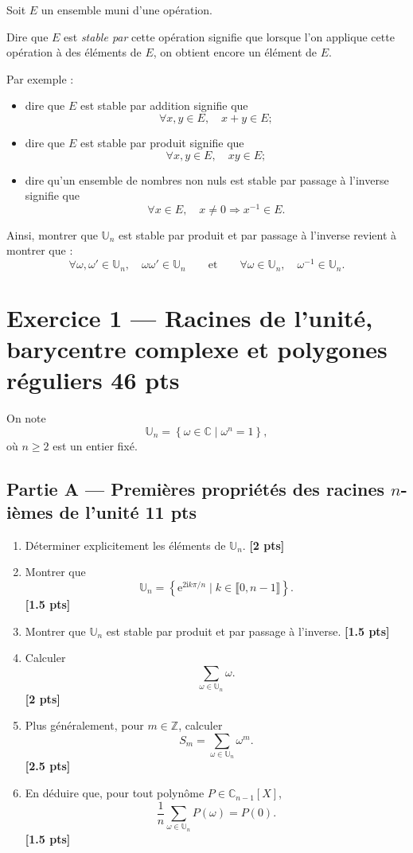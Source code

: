 \documentclass[11pt,a4paper]{article}
\newcommand{\C}{\mathbb{C}}
\newcommand{\U}{\mathbb{U}}
\newcommand{\ii}{\mathrm{i}}
\newcommand{\e}{\mathrm{e}}
\newcommand{\bareme}[1]{\hfill{\small\textbf{[#1 pts]}}}
\begin{document}
Soit \(E\) un ensemble muni d'une opération.

Dire que \(E\) est \emph{stable par} cette opération signifie que lorsque l'on applique cette opération à des éléments de \(E\), on obtient encore un élément de \(E\).

Par exemple :
\begin{itemize}
    \item dire que \(E\) est stable par addition signifie que
    \[
    \forall x,y\in E,\quad x+y\in E;
    \]
    \item dire que \(E\) est stable par produit signifie que
    \[
    \forall x,y\in E,\quad xy\in E;
    \]
    \item dire qu'un ensemble de nombres non nuls est stable par passage à l'inverse signifie que
    \[
    \forall x\in E,\quad x\neq 0 \Longrightarrow x^{-1}\in E.
    \]
\end{itemize}

Ainsi, montrer que \(\U_n\) est stable par produit et par passage à l'inverse revient à montrer que :
\[
\forall \omega,\omega'\in\U_n,\quad \omega\omega'\in\U_n
\qquad\text{et}\qquad
\forall \omega\in\U_n,\quad \omega^{-1}\in\U_n.
\]
\bigskip

\section*{Exercice 1 --- Racines de l'unité, barycentre complexe et polygones réguliers \hfill \textbf{46 pts}}

On note
\[
\U_n=\left\{\omega\in\C\mid \omega^n=1\right\},
\]
où \(n\ge 2\) est un entier fixé.

\subsection*{Partie A --- Premières propriétés des racines \(n\)-ièmes de l'unité \hfill \textbf{11 pts}}

\begin{enumerate}[label=\textbf{A.\arabic*.}]
    \item Déterminer explicitement les éléments de \(\U_n\).
    \bareme{2}

    \item Montrer que
    \[
    \U_n=\left\{\e^{2\ii k\pi/n}\mid k\in\llbracket 0,n-1\rrbracket\right\}.
    \]
    \bareme{1.5}

    \item Montrer que \(\U_n\) est stable par produit et par passage à l'inverse.
    \bareme{1.5}

    \item Calculer
    \[
    \sum_{\omega\in\U_n}\omega.
    \]
    \bareme{2}

    \item Plus généralement, pour \(m\in\mathbb{Z}\), calculer
    \[
    S_m=\sum_{\omega\in\U_n}\omega^m.
    \]
    \bareme{2.5}

    \item En déduire que, pour tout polynôme \(P\in\C_{n-1}[X]\),
    \[
    \frac1n\sum_{\omega\in\U_n}P(\omega)=P(0).
    \]
    \bareme{1.5}
\end{enumerate}
\end{document}
